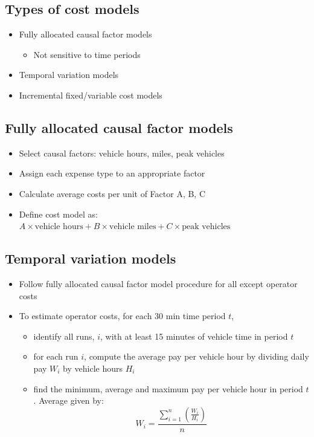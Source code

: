 \documentclass[11pt]{article}
\begin{document}
\subsection{Types of cost models}
\label{sec:org7e08cdc}
\begin{itemize}
\item Fully allocated causal factor models
\begin{itemize}
\item Not sensitive to time periods
\end{itemize}
\item Temporal variation models
\item Incremental fixed/variable cost models
\end{itemize}

\subsection{Fully allocated causal factor models}
\label{sec:org1fb39d0}
\begin{itemize}
\item Select causal factors: vehicle hours, miles, peak vehicles
\item Assign each expense type to an appropriate factor
\item Calculate average costs per unit of Factor A, B, C
\item Define cost model as: \(A \times \text{vehicle hours} + B \times \text{vehicle miles} + C \times \text{peak vehicles}\)
\end{itemize}

\subsection{Temporal variation models}
\label{sec:org84d4c72}
\begin{itemize}
\item Follow fully allocated causal factor model procedure for all except operator costs
\item To estimate operator costs, for each 30 min time period \(t\),
\begin{itemize}
\item identify all runs, \(i\), with at least 15 minutes of vehicle time in period \(t\)
\item for each run \(i\), compute the average pay per vehicle hour by dividing daily pay \(W_i\) by vehicle hours \(H_i\)
\item find the minimum, average and maximum pay per vehicle hour in period \(t\). Average given by:
\[W_i = \frac{\sum^{n}_{i=1}(\frac{W_i}{H_i})}{n}\]
\end{itemize}
\end{itemize}
\end{document}
